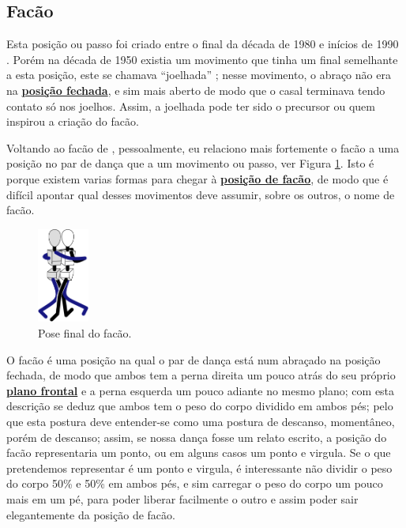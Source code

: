 \subsection{Facão}
\label{subsec:desc:passo:facao}

\caracterpostura{\CheckedItem}{\NoCheckedItem}
Esta posição ou passo foi  criado entre o final da década de 1980 e inícios de 1990  \cite[pp. 143]{perna2002samba}.
Porém na década de 1950 existia um movimento que tinha um final semelhante a esta posição, 
este se chamava ``joelhada'' \cite[pp. 160]{fornaciari1950aprender};
nesse movimento, o abraço não era na \hyperref[def:closed-position]{\textbf{posição fechada}},
e sim mais aberto de modo que o casal terminava tendo contato só nos joelhos.
Assim, a joelhada pode ter sido o precursor ou quem inspirou a criação do facão.

Voltando ao facão de \AnoLivro, pessoalmente, eu relaciono mais fortemente
o facão a uma posição no par de dança que 
a um movimento ou passo, ver Figura \ref{fig:facaostickman}. 
Isto é porque existem varias formas para chegar à \hyperref[def:facao-position]{\textbf{posição de facão}},
de modo que é difícil apontar qual desses movimentos deve assumir, sobre os outros, o nome de facão.

\begin{figure}
  \vspace{-10pt}
  \centering
    \includegraphics[width=0.15\textwidth]{chapters/cap-historia-passos/facao.eps}
  \caption{Pose final do facão.}
  \label{fig:facaostickman}
  \vspace{-10pt}
\end{figure}
O facão é uma posição na qual o par de dança está num abraçado 
na posição fechada, 
de modo que ambos tem a perna direita um pouco atrás do seu próprio
\hyperref[def:PlanoFrontal]{\textbf{plano frontal}}
e a perna esquerda um pouco adiante no mesmo plano; com esta descrição se deduz 
que ambos tem o peso do corpo dividido em ambos pés; pelo que esta postura
deve entender-se como uma postura de descanso, momentâneo, porém de descanso;
assim, se nossa dança fosse um relato escrito, a posição do facão
representaria um ponto, ou em alguns casos um ponto e virgula.
Se o que pretendemos representar é um ponto e virgula, 
é interessante não dividir o peso do corpo 50\% e 50\% em ambos pés,
e sim carregar o peso do corpo um pouco mais em um pé,
para poder liberar facilmente o outro e assim poder sair elegantemente da posição de facão.  

